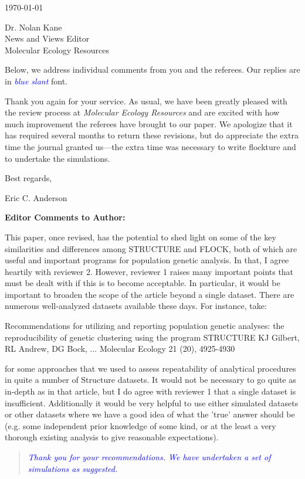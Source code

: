 \documentclass[11pt]{letter}
\newcommand{\reply}[1]{\begin{quotation}\small\sl\textcolor{blue}{#1}\end{quotation}}
\begin{document}
\begin{letter}{ \today 

Dr. Nolan Kane\\
News and Views Editor\\
Molecular Ecology Resources \\
}
Below, we address individual comments from you and the referees.  Our replies are in \textcolor{blue}{{\sl blue slant}} font.

Thank you again for your service.  As usual, we have been greatly pleased with the review process
at {\em Molecular Ecology Resources} and are excited with how much improvement the referees have brought
to our paper.  We apologize that it has required several months to return these revisions, but do appreciate
the extra time the journal granted us---the extra time was necessary to write {\sc flockture} and to undertake the
simulations.  

Best regards,

\vspace*{3em}

Eric C. Anderson

\vspace*{6em}

{\bf Editor Comments to Author:}


This paper, once revised, has the potential to shed light on some of the key similarities and differences among STRUCTURE and FLOCK, both of which are useful and important programs for population genetic analysis.  In that, I agree heartily with reviewer 2. However, reviewer 1 raises many important points that must be dealt with if this is to become acceptable. In particular, it would be important to broaden the scope of the article beyond a single dataset.  There are numerous well-analyzed datasets available these days.  For instance, take:

Recommendations for utilizing and reporting population genetic analyses: the reproducibility of genetic clustering using the program STRUCTURE
KJ Gilbert, RL Andrew, DG Bock, ...
Molecular Ecology 21 (20), 4925-4930

for some approaches that we used to assess repeatability of analytical procedures in quite a number of Structure datasets.  It would not be necessary to go quite as in-depth as in that article, but I do agree with reviewer 1 that a single dataset is insufficient.  Additionally it would be very helpful to use either simulated datasets or other datasets where we have a good idea of what the 'true' answer should be (e.g. some independent prior knowledge of some kind, or at the least a very thorough existing analysis to give reasonable expectations).

\reply{Thank you for your recommendations.  We have undertaken a set of simulations as suggested.}


\end{letter}
\end{document}
